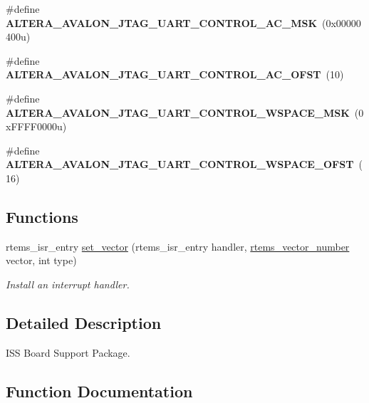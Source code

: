 \begin{DoxyCompactItemize}
\#define {\bfseries A\+L\+T\+E\+R\+A\+\_\+\+A\+V\+A\+L\+O\+N\+\_\+\+J\+T\+A\+G\+\_\+\+U\+A\+R\+T\+\_\+\+C\+O\+N\+T\+R\+O\+L\+\_\+\+A\+C\+\_\+\+M\+SK}~(0x00000400u)
\item 
\mbox{\label{group__RTEMSBSPsNios2ISS_gadb21d2dd0edbc584fcea11e088802e01}} 
\#define {\bfseries A\+L\+T\+E\+R\+A\+\_\+\+A\+V\+A\+L\+O\+N\+\_\+\+J\+T\+A\+G\+\_\+\+U\+A\+R\+T\+\_\+\+C\+O\+N\+T\+R\+O\+L\+\_\+\+A\+C\+\_\+\+O\+F\+ST}~(10)
\item 
\mbox{\label{group__RTEMSBSPsNios2ISS_gad4e7eb13a7fb5e3127ceba7d39d546f2}} 
\#define {\bfseries A\+L\+T\+E\+R\+A\+\_\+\+A\+V\+A\+L\+O\+N\+\_\+\+J\+T\+A\+G\+\_\+\+U\+A\+R\+T\+\_\+\+C\+O\+N\+T\+R\+O\+L\+\_\+\+W\+S\+P\+A\+C\+E\+\_\+\+M\+SK}~(0x\+F\+F\+F\+F0000u)
\item 
\mbox{\label{group__RTEMSBSPsNios2ISS_gadd3db4333b38ccf28fd6555f9c6c7468}} 
\#define {\bfseries A\+L\+T\+E\+R\+A\+\_\+\+A\+V\+A\+L\+O\+N\+\_\+\+J\+T\+A\+G\+\_\+\+U\+A\+R\+T\+\_\+\+C\+O\+N\+T\+R\+O\+L\+\_\+\+W\+S\+P\+A\+C\+E\+\_\+\+O\+F\+ST}~(16)
\end{DoxyCompactItemize}
\subsection*{Functions}
\begin{DoxyCompactItemize}
\item 
rtems\+\_\+isr\+\_\+entry \mbox{\hyperlink{group__RTEMSBSPsNios2ISS_gab3388042c56b34c40be81fd5f028d97e}{set\+\_\+vector}} (rtems\+\_\+isr\+\_\+entry handler, \mbox{\hyperlink{group__ClassicINTR_ga3e434c197d99f128e78cae4d9358bd8b}{rtems\+\_\+vector\+\_\+number}} vector, int type)
\begin{DoxyCompactList}\small\item\em Install an interrupt handler. \end{DoxyCompactList}\end{DoxyCompactItemize}


\subsection{Detailed Description}
I\+SS Board Support Package. 



\subsection{Function Documentation}
\mbox{\label{group__RTEMSBSPsNios2ISS_gab3388042c56b34c40be81fd5f028d97e}} 
